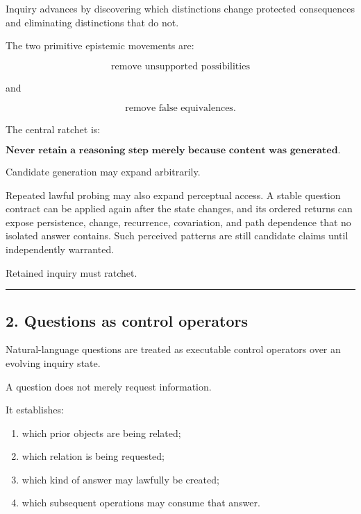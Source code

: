 \documentclass[
]{article}
\providecommand{\tightlist}{%
  \setlength{\itemsep}{0pt}\setlength{\parskip}{0pt}}
\begin{document}
Inquiry advances by discovering which distinctions change protected
consequences and eliminating distinctions that do not.

The two primitive epistemic movements are:

\[
\boxed{
\text{remove unsupported possibilities}
}
\]

and

\[
\boxed{
\text{remove false equivalences}.
}
\]

The central ratchet is:

\[
\boxed{
\textbf{Never retain a reasoning step merely because content was generated.
Retain it only if it produces a warranted consequential change.}
}
\]

Candidate generation may expand arbitrarily.

Repeated lawful probing may also expand perceptual access. A stable question
contract can be applied again after the state changes, and its ordered returns
can expose persistence, change, recurrence, covariation, and path dependence
that no isolated answer contains. Such perceived patterns are still candidate
claims until independently warranted.

Retained inquiry must ratchet.

\begin{center}\rule{0.5\linewidth}{0.5pt}\end{center}

\subsection{2. Questions as control
operators}\label{questions-as-control-operators}

Natural-language questions are treated as executable control operators
over an evolving inquiry state.

A question does not merely request information.

It establishes:

\begin{enumerate}
\def\labelenumi{\arabic{enumi}.}
\tightlist
\item
  which prior objects are being related;
\item
  which relation is being requested;
\item
  which kind of answer may lawfully be created;
\item
  which subsequent operations may consume that answer.
\end{enumerate}
\end{document}
